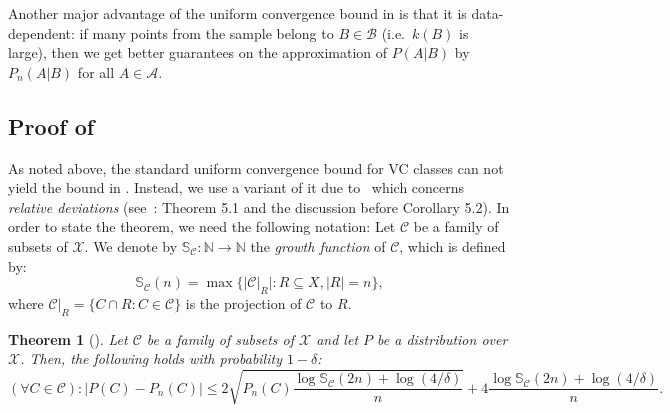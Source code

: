 \documentclass{article}
\def\X{{\mathcal X}}
\newcommand{\cA}{\mathcal{A}}
\newcommand{\cB}{\mathcal{B}}
\newcommand{\cC}{\mathcal{C}}
\newtheorem{theorem}{Theorem}
\begin{document}
Another major advantage of the uniform convergence bound in  is that it is data-dependent: 
if many points from the sample belong to $B\in \cB$ (i.e.\ $k(B)$ is large), 
then we get better guarantees on the approximation of $P(A\vert B)$ by $P_n(A\vert B)$ for all $A\in\cA$.



\subsection{Proof of }

As noted above,
the standard uniform convergence bound for VC classes
can not yield the bound in .
Instead, we use a variant of it due to~\cite{B05} which concerns {\it relative deviations}
(see~\cite{BBL05}: Theorem 5.1 and the discussion before Corollary 5.2).
In order to state the theorem, we need the following notation:
Let $\cC$ be a family of subsets of $\X$. We denote by $\mathbb{S}_\cC:\mathbb{N}\to\mathbb{N}$ the {\it growth function} of $\cC$, which is defined by:
\[
\mathbb{S}_\cC(n) = \max\{\lvert \cC|_R\rvert : R\subseteq X, \lvert R\rvert=n\},
\]
where $\cC|_R=\{C\cap R : C\in\cC\}$ is the projection of $\cC$ to $R$.
\begin{theorem}[\cite{BBL05}]\label{thm:ucrel}
Let $\cC$ be a family of subsets of $\X$  and let $P$
be a distribution over $\X$. Then, the following holds with probability $1-\delta$:
\[
(\forall C\in \cC): \lvert P(C)- P_n(C) \rvert \leq  2\sqrt{P_n(C)\frac{\log\mathbb{S}_\cC(2n) + \log(4/\delta)}{n}} + 4\frac{\log\mathbb{S}_\cC(2n) + \log(4/\delta)}{n}. 
\]
\end{theorem}
\end{document}
